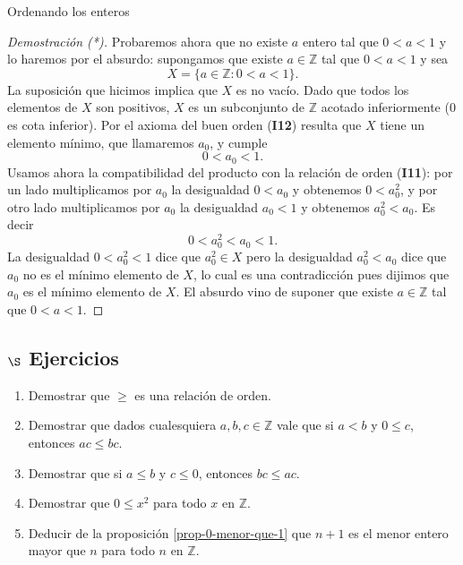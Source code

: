\begin{section}{Ordenando los enteros}
\begin{proof}[Demostración (*)]
	 
	
	
Probaremos ahora que no existe $a$ entero tal que $ 0<a<1$ y lo haremos por el absurdo: supongamos que existe $a \in \mathbb Z$ tal que $0<a<1$ y sea 
$$
X=\{a\in\mathbb Z: 0<a<1\}.
$$
La  suposición que hicimos implica que $X$ es no vacío. 
Dado que todos los elementos de $X$ son positivos, $X$ es un subconjunto de $\mathbb Z$ acotado inferiormente ($0$ es cota inferior).
Por el axioma del buen orden (\textbf{I12}) resulta que $X$ tiene un elemento mínimo, que llamaremos $a_0$, y cumple
$$
0<a_0<1. 
$$
Usamos ahora la compatibilidad del  producto con 
la relación de orden (\textbf{I11}): 
por un lado multiplicamos por $a_0$ la desigualdad $0<a_0$ y obtenemos $0<a_0^2$, 
y por otro lado multiplicamos por $a_0$ la desigualdad $a_0<1$ y obtenemos $a_0^2<a_0$. Es decir
$$
 0<a_0^2<a_0<1.
$$
La desigualdad $0<a_0^2<1$ dice que $a_0^2\in X$ pero la desigualdad $a_0^2<a_0$ dice que 
$a_0$ no es el mínimo elemento de $X$, lo cual es una contradicción pues dijimos que $a_0$ es el mínimo elemento de $X$. 
El  absurdo  vino de suponer que existe $a \in \mathbb Z$ tal que   $0<a<1$.
\end{proof}


\subsection*{\Large $\S$ Ejercicios}



\begin{enumerate}[1)]
		\item Demostrar que $\ge$ es una relación de orden.
		
		\item Demostrar que dados cualesquiera $a,b,c \in \mathbb Z$ vale que si $a< b$ y $0\le c$, entonces $ac \le bc$. 
		
		\item Demostrar que si $a\le b$ y $c\le 0$, entonces $bc \le ac$.
		
		\item Demostrar que $0\le x^2$ para todo $x$ en $\mathbb Z$.
		
		\item Deducir de la proposición \ref{prop-0-menor-que-1} que $n+1$ es el menor entero mayor que $n$ para todo $n$ en $\mathbb Z$.


\end{enumerate}
\end{section}
